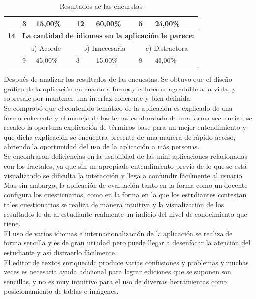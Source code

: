 \documentclass[letterpaper, 11pt, oneside]{article}
\theoremstyle{definition}
\theoremstyle{remark}
\begin{document}
\begin{table}[htbp]
\begin{center}
\begin{tabular}{|p{1.6cm}|p{1.8cm}|p{1.8cm}|p{1.8cm}|p{1.8cm}|p{1.8cm}|p{1.8cm}|}
 & 3 & 15,00\% & 12 & 60,00\% & 5 & 25,00\% \\ \hline
\textbf{14} & \multicolumn{ 6}{c|}{\textbf{La cantidad de idiomas en la aplicación le parece:}} \\ \hline
 & \multicolumn{ 2}{c|}{a) Acorde} & \multicolumn{ 2}{c|}{b) Innecesaria} & \multicolumn{ 2}{c|}{c) Distractora} \\ \hline
 & 9 & 45,00\% & 3 & 15,00\% & 8 & 40,00\% \\ \hline
\end{tabular}
\end{center}
\caption{Resultados de las encuestas}
\label{encuesta}
\end{table}


Después de analizar los resultados de las encuestas. Se obtuvo que el diseño gráfico de la aplicación en cuanto a forma y colores es agradable a la vista, y sobresale por mantener una interfaz coherente y bien definida. \\

Se comprobó que el contenido temático de la aplicación es explicado de una forma coherente y el manejo de los temas es abordado de una forma secuencial, se recalco la oportuna explicación de términos base para un mejor entendimiento y que dicha explicación se encuentra presente de una manera de rápido acceso, abriendo la oportunidad del uso de la aplicación a más personas. \\

Se encontraron deficiencias en la usabilidad de las mini-aplicaciones relacionadas con los fractales, ya que sin un apropiado entendimiento previo de lo que se está visualizando se dificulta la interacción y llega a confundir fácilmente al usuario. Mas sin embargo, la aplicación de evaluación tanto en la forma como un docente configura los cuestionarios, como en la forma en la que los estudiantes contestan tales cuestionarios se realiza de manera intuitiva y la visualización de los resultados le da al estudiante realmente un indicio del nivel de conocimiento que tiene. \\

El uso de varios idiomas e internacionalización de la aplicación se realiza de forma sencilla y es de gran utilidad pero puede llegar a desenfocar la atención del estudiante y así distraerlo fácilmente. \\

El editor de textos enriquecido produce varias confusiones y problemas y muchas veces es necesaria ayuda adicional para lograr ediciones que se suponen son sencillas, y no es muy intuitivo para el uso de diversas herramientas como posicionamiento de tablas e imágenes. \\
\end{document}
